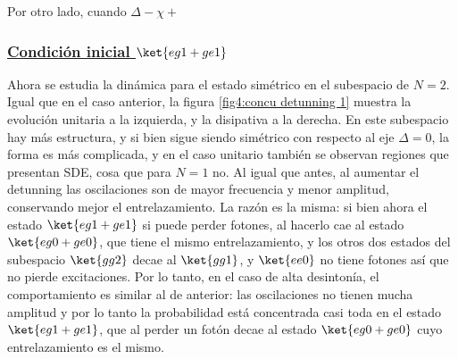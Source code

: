 Por otro lado, cuando $\Delta-\chi+$
\subsubsection{\underline{Condición inicial $\ket{eg1+ge1}$}}
Ahora se estudia la dinámica para el estado simétrico en el subespacio de $N=2$. Igual que en el caso anterior, la figura \ref{fig4:concu detunning 1} muestra la evolución unitaria a la izquierda, y la disipativa a la derecha. En este subespacio hay más estructura, y si bien sigue siendo simétrico con respecto al eje $\Delta=0$, la forma es más complicada, y en el caso unitario también se observan regiones que presentan SDE, cosa que para $N=1$ no. Al igual que antes, al aumentar el detunning las oscilaciones son de mayor frecuencia y menor amplitud, conservando mejor el entrelazamiento. La razón es la misma: si bien ahora el estado $\ket{eg1+ge1}$ si puede perder fotones, al hacerlo cae al estado $\ket{eg0+ge0}$, que tiene el mismo entrelazamiento, y los otros dos estados del subespacio $\ket{gg2}$ decae al $\ket{gg1}$, y $\ket{ee0}$ no tiene fotones así que no pierde excitaciones. Por lo tanto, en el caso de alta desintonía, el comportamiento es similar al de anterior: las oscilaciones no tienen mucha amplitud y por lo tanto la probabilidad está concentrada casi toda en el estado $\ket{eg1+ge1}$, que al perder un fotón decae al estado $\ket{eg0+ge0}$ cuyo entrelazamiento es el mismo.
